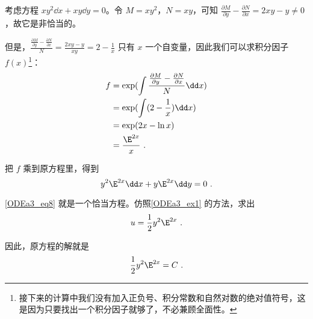 \begin{example}{}
考虑方程 $xy^2\dd x+xy\dd y=0$。令 $M=xy^2$，$N=xy$，可知 $\frac{\partial M}{\partial y}-\frac{\partial N}{\partial x}=2xy-y\not=0$，故它是非恰当的。

但是，$\frac{\frac{\partial M}{\partial y}-\frac{\partial N}{\partial x}}{N}=\frac{2xy-y}{xy}=2-\frac{1}{x}$ 只有 $x$ 一个自变量，因此我们可以求积分因子 $f(x)$\footnote{接下来的计算中我们没有加入正负号、积分常数和自然对数的绝对值符号，这是因为只要找出一个积分因子就够了，不必兼顾全面性。}：
\begin{equation}
\begin{aligned}
f&=\exp(\int \frac{\frac{\partial M}{\partial y}-\frac{\partial N}{\partial x}}{N}\dd x)\\
&=\exp(\int(2-\frac{1}{x})\dd x)\\
&=\exp(2x-\ln x)\\
&=\frac{\E^{2x}}{x}~.
\end{aligned}
\end{equation}

把 $f$ 乘到原方程里，得到
\begin{equation}\label{ODEa3_eq8}
y^2\E^{2x}\dd x+y\E^{2x}\dd y=0~.
\end{equation}

\autoref{ODEa3_eq8} 就是一个恰当方程。仿照\autoref{ODEa3_ex1} 的方法，求出
\begin{equation}
u=\frac{1}{2}y^2\E^{2x}~.
\end{equation}

因此，原方程的解就是
\begin{equation}
\frac{1}{2}y^2\E^{2x}=C~.
\end{equation}



\end{example}





